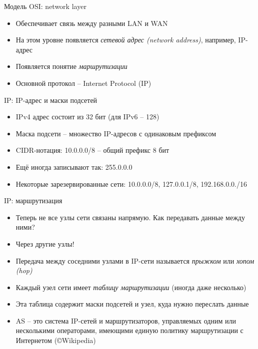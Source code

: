 \documentclass[10pt,pdf,hyperref={unicode}]{beamer}
\begin{document}
\begin{frame}{Модель OSI: network layer}
\begin{itemize}
    \item Обеспечивает связь между разными LAN и WAN
    \item На этом уровне появляется \emph{сетевой адрес (network address)}, например, IP-адрес
    \item Появляется понятие \emph{маршрутизации}
    \item Основной протокол -- Internet Protocol (IP)
\end{itemize}
\end{frame}

\begin{frame}{IP: IP-адрес и маски подсетей}
\begin{itemize}
    \item IPv4 адрес состоит из 32 бит (для IPv6 -- 128)
    \item Маска подсети -- множество IP-адресов с одинаковым префиксом
    \item CIDR-нотация: 10.0.0.0/8 -- общий префикс 8 бит
    \item Ещё иногда записывают так: 255.0.0.0
    \item Некоторые зарезервированные сети: 10.0.0.0/8, 127.0.0.1/8, 192.168.0.0./16
\end{itemize}
\end{frame}

\begin{frame}{IP: маршрутизация}
\begin{itemize}
    \item Теперь не все узлы сети связаны напрямую. Как передавать данные между ними?
    \item Через другие узлы!
    \item Передача между соседними узлами в IP-сети называется \emph{прыжком} или \emph{хопом (hop)}
    \item Каждый узел сети имеет \emph{таблицу маршрутизации} (иногда даже несколько)
    \item Эта таблица содержит маски подсетей и узел, куда нужно переслать данные
    \item AS -- это система IP-сетей и маршрутизаторов, управляемых одним или несколькими операторами, имеющими единую политику маршрутизации с Интернетом (\copyright Wikipedia)
\end{itemize}
\end{frame}
\end{document}
